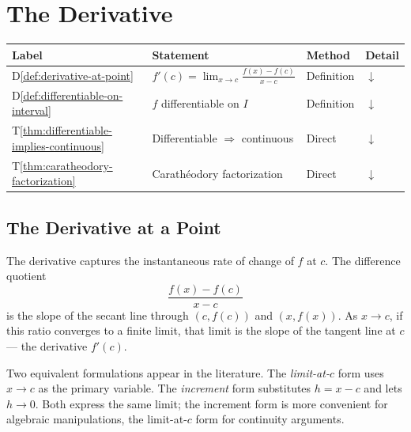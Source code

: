 
\section{The Derivative}

\begin{tcolorbox}[colback=gray!6, colframe=gray!40, arc=2pt,
  left=6pt, right=6pt, top=4pt, bottom=4pt,
  title={\small\textbf{Derivative Definition — Quick Reference}},
  fonttitle=\small\bfseries]
\small
\begin{tabular}{l l l l}
\toprule
\textbf{Label} & \textbf{Statement} & \textbf{Method} & \textbf{Detail} \\
\midrule
D\ref{def:derivative-at-point}
  & $f'(c) = \lim_{x\to c}\frac{f(x)-f(c)}{x-c}$
  & Definition
  & \hyperref[def:derivative-at-point]{$\downarrow$} \\
D\ref{def:differentiable-on-interval}
  & $f$ differentiable on $I$
  & Definition
  & \hyperref[def:differentiable-on-interval]{$\downarrow$} \\
T\ref{thm:differentiable-implies-continuous}
  & Differentiable $\Rightarrow$ continuous
  & Direct
  & \hyperref[thm:differentiable-implies-continuous]{$\downarrow$} \\
T\ref{thm:caratheodory-factorization}
  & Carathéodory factorization
  & Direct
  & \hyperref[thm:caratheodory-factorization]{$\downarrow$} \\
\bottomrule
\end{tabular}
\end{tcolorbox}

\subsection{The Derivative at a Point}

\begin{remark}[Motivation]
The derivative captures the instantaneous rate of change of $f$ at $c$.
The difference quotient
\[
\frac{f(x) - f(c)}{x - c}
\]
is the slope of the secant line through $(c, f(c))$ and $(x, f(x))$.
As $x \to c$, if this ratio converges to a finite limit, that limit is
the slope of the tangent line at $c$ --- the derivative $f'(c)$.

Two equivalent formulations appear in the literature.
The \emph{limit-at-$c$} form uses $x \to c$ as the primary variable.
The \emph{increment} form substitutes $h = x - c$ and lets $h \to 0$.
Both express the same limit; the increment form is more convenient
for algebraic manipulations, the limit-at-$c$ form for continuity arguments.
\end{remark}

